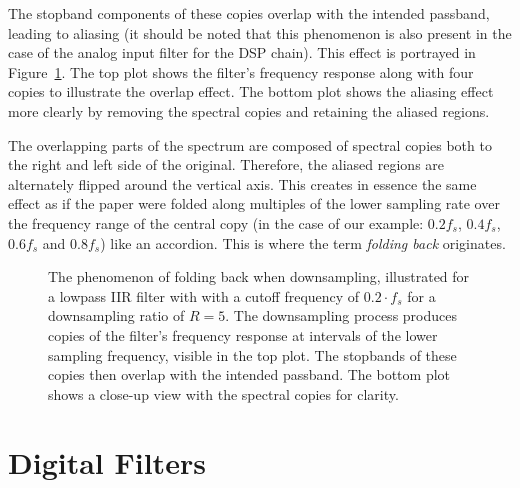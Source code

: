 The stopband  components of these  copies overlap with the  intended passband,
leading to aliasing  (it should be noted that this  phenomenon is also present
in the  case of  the analog input  filter for the  DSP chain). This  effect is
portrayed  in  Figure~\ref{fig:aliasing:iirCopies}. The  top  plot  shows  the
filter's frequency response  along with four copies to  illustrate the overlap
effect. The bottom plot shows the aliasing effect more clearly by removing the
spectral copies and retaining the aliased regions.

The overlapping parts of the spectrum  are composed of spectral copies both to
the right  and left side of  the original. Therefore, the aliased  regions are
alternately flipped around the vertical axis. This creates in essence the same
effect  as if  the paper  were folded  along multiples  of the  lower sampling
rate  over the  frequency  range of  the  central  copy (in  the  case of  our
example: $0.2f_s$, $0.4f_s$, $0.6f_s$ and $0.8f_s$) like an accordion. This is
where the term \emph{folding back} originates.

\begin{figure}
    \centering
    
    \caption[Folding Back of Stopband Components Into Passband]{%
        The phenomenon  of folding back  when downsampling, illustrated  for a
        lowpass IIR filter with with a  cutoff frequency of $0.2\cdot f_s$ for
        a  downsampling ratio  of  $R=5$.  The  downsampling process  produces
        copies of  the filter's frequency  response at intervals of  the lower
        sampling frequency, visible  in the top plot.  The  stopbands of these
        copies then overlap with the intended passband.  The bottom plot shows
        a close-up view with the spectral copies for clarity.%
    }
    \label{fig:aliasing:iirCopies}
\end{figure}

%
%
\section{Digital Filters}%
\label{sec:digital_filters}

